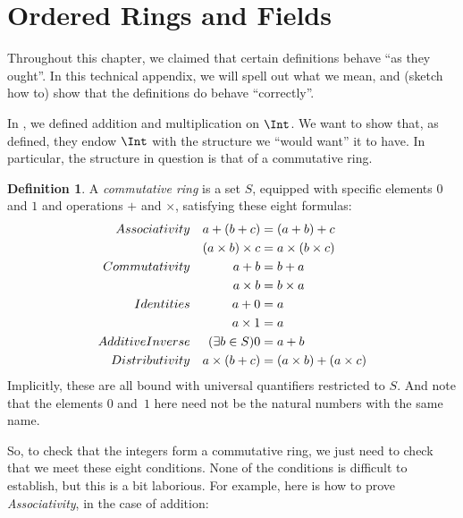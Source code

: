 \documentclass[10pt,a4paper]{article}
\makeatletter
\theoremstyle{plain}
\theoremstyle{definition}
\newtheorem{defn}[thm]{Definition}
\theoremstyle{remark}
\newcommand*{\olfileid}[3]{}
\newcommand*{\olsection}[1]{\section*{#1}}
\newcommand{\olref}{\@ifnextchar[{\olref@i}{\olref@final}}
\def\olref@i[#1]{\@ifnextchar[{\olref@ii}{\olref@final}}
\def\olref@ii[#1]{\@ifnextchar[{\olref@iii}{\olref@final}}
\def\olref@iii[#1]{\olref@final}
\def\olref@final#1{\ref{#1}}
\makeatother
\begin{document}
%


	
\olfileid{sfr}{arith}{check}
\olsection{Ordered Rings and Fields}

Throughout this chapter, we claimed that certain definitions behave
``as they ought''. In this technical appendix, we will spell out what
we mean, and (sketch how to) show that the definitions do behave
``correctly''. 

In \olref[int]{sec}, we defined addition and multiplication on $\Int$.
We want to show that, as defined, they endow $\Int$ with the structure
we ``would want'' it to have. In particular, the structure in question
is that of a commutative ring.

\begin{defn}
	A \emph{commutative ring} is a set $S$, equipped with specific elements $0$ and $1$ and operations $+$ and $\times$, satisfying these eight formulas:
	\begin{align*}
		\emph{Associativity}&&a + (b+ c) & = (a + b) + c \\
		&& (a \times b) \times c & = a \times (b\times c)\\
		\emph{Commutativity}&&a + b &= b+ a  \\
		&&  a \times b&= b\times a\\ 
		\emph{Identities}&&a + 0 &= a \\
		&& a \times 1 &= a\\
		\emph{Additive Inverse}&&(\exists b\in S)0&=a + b\\
		\emph{Distributivity}&&a \times (b+ c ) &= (a \times b) + (a \times c)
	\end{align*}
	Implicitly, these are all bound with universal quantifiers restricted to $S$. And note that the elements $0$ and~$1$ here need not be the natural numbers with the same name.
\end{defn}

So, to check that the integers form a commutative ring, we just need
to check that we meet these eight conditions. None of the conditions
is {difficult} to establish, but this is a bit laborious. For example,
here is how to prove \emph{Associativity}, in the case of addition:
\end{document}
